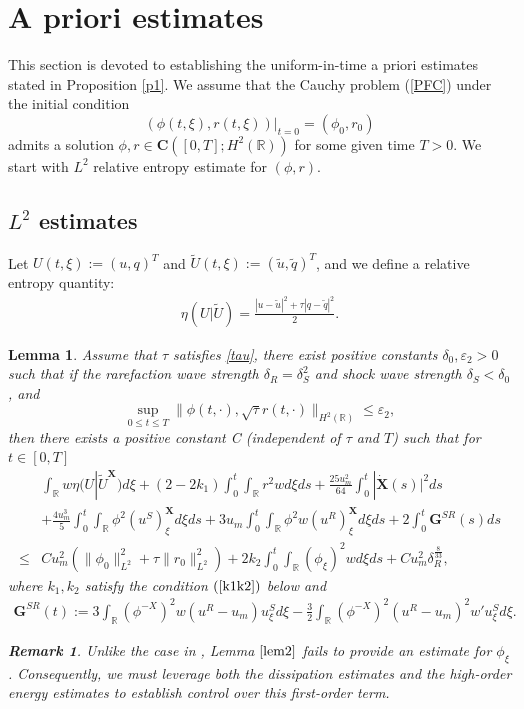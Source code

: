 \documentclass[10pt,reqno]{amsart}
\numberwithin{equation}{section}
\newtheorem{lemma}[theorem]{Lemma}
\newtheorem{remark}{Remark}[section]
\begin{document}
	
	\section{A priori estimates}\label{sec4}
	This section is devoted to establishing the uniform-in-time a priori estimates stated in Proposition \ref{p1}. We assume that the Cauchy problem (\ref{PFC}) under the initial condition $$\left(\phi(t,\xi),r(t,\xi)\right)|_{t=0}=\left(\phi_{0},r_{0}\right)$$ admits a solution $\phi,r\in \mathbf{C}\left([0,T];H^{2}(\mathbb{R})\right)$ for some given time $T>0.$ We start with $L^2$ relative entropy estimate for $\left(\phi,r\right)$.
	
	\subsection{$L^2$ estimates}
	Let $U(t,\xi):=(u,q)^{T}$ and $\tilde{U}(t,\xi):=(\tilde{u},\tilde{q})^{T}$, and we define a relative entropy quantity:
	\begin{align*}
		\eta(U|\tilde{U})=\frac{|u-\tilde{u}|^{2}+\tau|q-\tilde{q}|^{2}}{2}.
	\end{align*}
	\begin{lemma}\label{lem2}
		Assume that $\tau$ satisfies \eqref{tau}, there exist positive constants $\delta_{0},\varepsilon_{2}>0$ such that if the rarefaction wave strength $\delta_{R}=\delta_{S}^2$ and shock wave strength $\delta_{S}<\delta_{0}$, and $$\sup_{0\leq t\leq T} \|\phi(t,\cdot), \sqrt{\tau}r(t,\cdot)\|_{H^2(\mathbb{R})} \leq \varepsilon_2,$$ then there exists a positive constant C (independent of $\tau$ and $T$) such that for $t\in[0,T]$
		\begin{align*}
			&\int_{\mathbb{R}}w\eta(U|\tilde{U}^{\mathbf{X}})d\xi+ \left(2-2k_{1}\right)\int_0^t\int_{\mathbb{R}}r^2wd\xi ds + \frac{25u_m^2}{64}\int_0^t |\dot{\mathbf{X}}(s)|^2 ds \\
			&+ \frac{4u_m^3}{5}\int_0^t \int_{\mathbb{R}} \phi^2(u^S)_\xi^{\mathbf{X}} d\xi ds+3u_m\int_0^t \int_{\mathbb{R}} \phi^2w(u^R)_\xi^{\mathbf{X}} d\xi ds+2\int_0^t\mathbf{G}^{SR}(s)ds \\
			\leq& Cu_m^2 (\|\phi_0\|_{L^2}^2+\tau\|r_0\|_{L^2}^2 )+2k_2\int_{0}^t\int_{\mathbb{R}}\left(\phi_{\xi}\right)^2wd\xi ds+Cu_m^2\delta_R^{\frac{8}{33}},
		\end{align*}
		where $k_1,k_2$ satisfy the condition $(\ref{k1k2})$ below and
		\begin{align*}
			\mathbf{G}^{SR}(t):=3 \int_{\mathbb{R}} (\phi^{-X})^2 w(u^R - u_m) u_{\xi}^S d\xi - \frac{3}{2} \int_{\mathbb{R}} (\phi^{-X})^2 (u^R - u_m)^2 w' u_{\xi}^S d\xi.
		\end{align*}
		\begin{remark}
			Unlike the case in \cite{ref16}, Lemma $\ref{lem2}$ fails to provide an estimate for $\phi_{\xi}$. Consequently, we must leverage both the dissipation estimates and the high-order energy estimates to establish control over this first-order term.
		\end{remark}
	\end{lemma}
\end{document}
